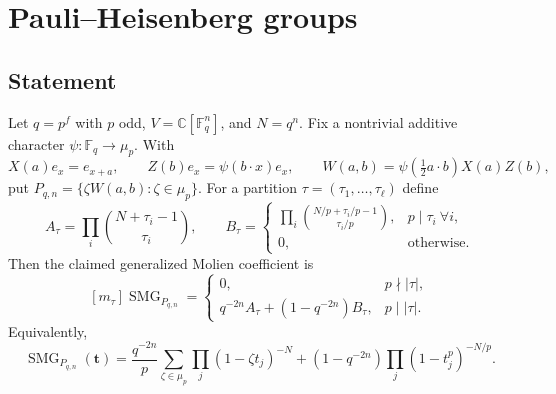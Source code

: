 \documentclass[10pt]{article}
\newcommand{\SMG}{\operatorname{SMG}}
\newcommand{\F}{\mathbb F}
\newcommand{\E}{\mathbb E}
\begin{document}
\section{Pauli--Heisenberg groups}\label{proof:pauli-heisenberg}
\begingroup
{}
\providecommand{\Sgm}{\SMG}
\renewcommand{\Sgm}{\SMG}
\providecommand{\E}{\mathbb E}
\renewcommand{\E}{\mathbb E}
\providecommand{\F}{\mathbb F}
\renewcommand{\F}{\mathbb F}
\setcounter{theorem}{0}
\setcounter{proposition}{0}
\setcounter{lemma}{0}
\setcounter{corollary}{0}
\setcounter{remark}{0}
\begin{abstract}
For odd characteristic we prove the two-spectrum formula for the defining
Schrödinger representation and check it by constructing every matrix in
$P_{3,1}$, $P_{5,1}$, $P_{9,1}$, and $H_3(\F_9)$.  The tests evaluate the
target invariant dimension directly, not from the spectral classification
used in the proof.  All 17 representative coefficient comparisons pass.
\end{abstract}

\subsection{Statement}
Let $q=p^f$ with $p$ odd, $V=\mathbb C[\F_q^n]$, and $N=q^n$.  Fix a
nontrivial additive character $\psi:\F_q\to\mu_p$.  With
\[
X(a)e_x=e_{x+a},\qquad Z(b)e_x=\psi(b\cdot x)e_x,
\qquad W(a,b)=\psi\!\left(\tfrac12a\cdot b\right)X(a)Z(b),
\]
put $P_{q,n}=\{\zeta W(a,b):\zeta\in\mu_p\}$.  For a partition
$\tau=(\tau_1,\ldots,\tau_\ell)$ define
\[
A_\tau=\prod_i\binom{N+\tau_i-1}{\tau_i},\qquad
B_\tau=\begin{cases}
\displaystyle\prod_i\binom{N/p+\tau_i/p-1}{\tau_i/p},&p\mid\tau_i\ \forall i,\\
0,&\text{otherwise.}
\end{cases}
\]
Then the claimed generalized Molien coefficient is
\begin{equation}\label{pauli-heisenberg-proof-and-verification:eq:coefficient}
[m_\tau]\Sgm_{P_{q,n}}=
\begin{cases}
0,&p\nmid |\tau|,\\
q^{-2n}A_\tau+(1-q^{-2n})B_\tau,&p\mid |\tau|.
\end{cases}
\end{equation}
Equivalently,
\begin{equation}\label{pauli-heisenberg-proof-and-verification:eq:series}
\Sgm_{P_{q,n}}(\mathbf t)=
\frac{q^{-2n}}p\sum_{\zeta\in\mu_p}\prod_j(1-\zeta t_j)^{-N}
+(1-q^{-2n})\prod_j(1-t_j^p)^{-N/p}.
\end{equation}
\end{document}
